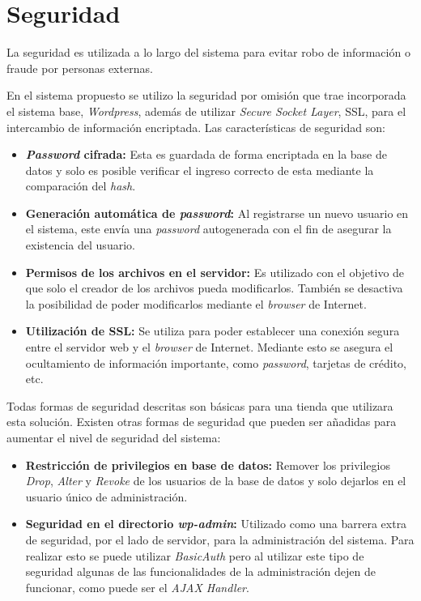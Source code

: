\section{Seguridad}

La seguridad es utilizada a lo largo del sistema para evitar robo de información o 
fraude por personas externas. 

En el sistema propuesto se utilizo la seguridad por omisión que trae incorporada
el sistema base, \emph{Wordpress}, además de utilizar \emph{Secure Socket Layer}, SSL, para el
 intercambio de información encriptada. Las características de seguridad son:

\begin{itemize}

\item {\bf \emph{Password} cifrada:} Esta es guardada de forma encriptada en la base de datos y solo es 
	posible verificar el ingreso correcto de esta mediante la comparación del \emph{hash}.
\item {\bf Generación automática de \emph{password}:} Al registrarse un nuevo usuario en el sistema, este 
	envía una \emph{password} autogenerada con el fin de asegurar la existencia del usuario.
\item {\bf Permisos de los archivos en el servidor:} Es utilizado con el objetivo de que solo el creador
	de los archivos pueda modificarlos. También se desactiva la posibilidad de poder modificarlos
	mediante el \emph{browser} de Internet.
\item {\bf Utilización de SSL:} Se utiliza para poder establecer una conexión segura entre el servidor web
	y el \emph{browser} de Internet. Mediante esto se asegura el ocultamiento de información
	importante, como \emph{password}, tarjetas de crédito, etc. 
\end{itemize}  

Todas formas  de seguridad descritas son básicas para una tienda que utilizara esta solución. Existen 
otras formas de seguridad que pueden ser añadidas para aumentar el nivel de seguridad del sistema:

\begin{itemize}

\item {\bf Restricción de privilegios en base de datos:} Remover los privilegios \emph{Drop}, 
\emph{Alter} y \emph{Revoke} de los usuarios de la base de datos y solo dejarlos en el usuario
único de administración.

\item {\bf Seguridad en el directorio \emph{wp-admin}:} Utilizado como una barrera extra de seguridad,
por el lado de servidor, para la administración del sistema. Para realizar esto se puede utilizar 
\emph{BasicAuth} pero al utilizar este tipo de seguridad algunas de las funcionalidades de la 
administración dejen de funcionar, como puede ser el \emph{AJAX Handler}.

\end{itemize}

